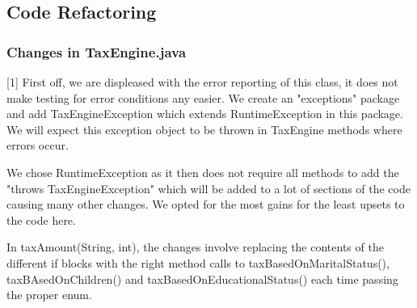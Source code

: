 
\subsection{Code Refactoring}



\subsubsection{Changes in TaxEngine.java}

[1] First off, we are displeased with the error reporting of this class, it does not make testing for error conditions any easier. We create an "exceptions" package and add TaxEngineException which extends RuntimeException in this package. We will expect this exception object to be thrown in TaxEngine methods where errors occur. 

We chose RuntimeException as it then does not require all methods to add the "throws TaxEngineException" which will be added to a lot of sections of the code causing many other changes. We opted for the most gains for the least upsets to the code here. 


In taxAmount(String, int), the changes involve replacing the contents of the different if blocks with the right method calls to taxBasedOnMaritalStatus(), taxBAsedOnChildren() and taxBasedOnEducationalStatus() each time passing the proper enum. 


